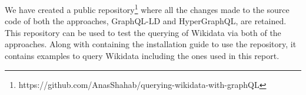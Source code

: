 We have created a public repository\footnote{https://github.com/AnasShahab/querying-wikidata-with-graphQL} where all the changes made to the source code of both the approaches, GraphQL-LD and HyperGraphQL, are retained. This repository can be used to test the querying of Wikidata via both of the approaches. Along with containing the installation guide to use the repository, it contains examples to query Wikidata including the ones used in this report.